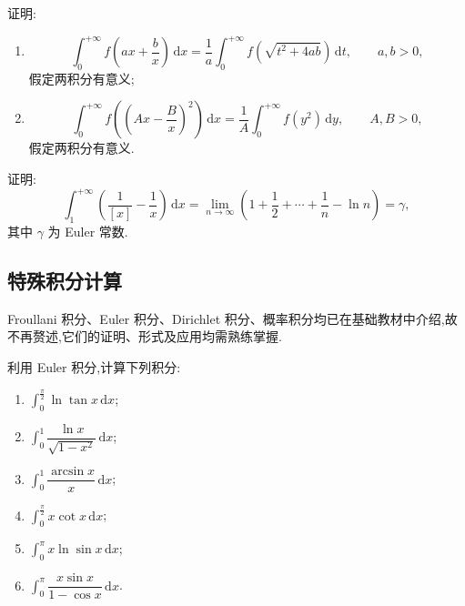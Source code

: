 \documentclass[../../数学分析培优讲义.tex]{subfiles}
\begin{document}
\begin{example}
证明:
\begin{enumerate}[label=(\arabic*)]
    \item
    \[
        \int_0^{+\infty}f\left(ax+\dfrac{b}{x}\right)\,\mathrm{d}x
        =\dfrac{1}{a}\int_0^{+\infty}f\left(\sqrt{t^2+4ab}\right)\,\mathrm{d}t,
        \qquad a,b>0,
    \]
    假定两积分有意义;
    \item
    \[
        \int_0^{+\infty}f\left(\left(Ax-\dfrac{B}{x}\right)^2\right)\,\mathrm{d}x
        =\dfrac{1}{A}\int_0^{+\infty}f(y^2)\,\mathrm{d}y,
        \qquad A,B>0,
    \]
    假定两积分有意义.
\end{enumerate}
\end{example}
\exampleblank

\begin{example}[\markstar]
证明:
\[
    \int_1^{+\infty}\left(\dfrac{1}{[x]}-\dfrac{1}{x}\right)\,\mathrm{d}x
    =\lim\limits_{n\to\infty}\left(1+\dfrac{1}{2}+\cdots+\dfrac{1}{n}-\ln n\right)
    =\gamma,
\]
其中 $\gamma$ 为 Euler 常数.
\end{example}
\exampleblank



\subsection{特殊积分计算}

Froullani 积分、Euler 积分、Dirichlet 积分、概率积分均已在基础教材中介绍,故不再赘述,它们的证明、形式及应用均需熟练掌握.

\begin{example}
利用 Euler 积分,计算下列积分:
\begin{enumerate}[label=(\arabic*)]
    \item $\displaystyle\int_0^{\frac{\pi}{2}}\ln\tan x\,\mathrm{d}x$;
    \item $\displaystyle\int_0^1\dfrac{\ln x}{\sqrt{1-x^2}}\,\mathrm{d}x$;
    \item $\displaystyle\int_0^1\dfrac{\arcsin x}{x}\,\mathrm{d}x$;
    \item $\displaystyle\int_0^{\frac{\pi}{2}}x\cot x\,\mathrm{d}x$;
    \item $\displaystyle\int_0^\pi x\ln\sin x\,\mathrm{d}x$;
    \item $\displaystyle\int_0^\pi\dfrac{x\sin x}{1-\cos x}\,\mathrm{d}x$.
\end{enumerate}
\end{example}
\exampleblank
\end{document}
